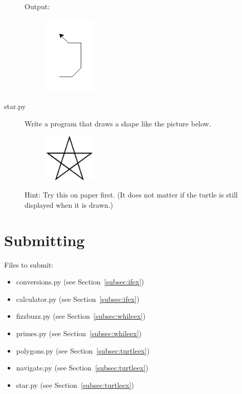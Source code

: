 \documentclass[11pt]{cselabheader}
\begin{document}
\begin{description}
    Output:
  \begin{figure}[!ht]
    \centering
    \includegraphics[width=1.0in]{img/navigate}
  \end{figure}

  \item[star.py] Write a program that draws a shape like the picture below.

    \begin{figure}[!ht]
      \centering
      \includegraphics[width=1.0in]{img/star}
    \end{figure}

    Hint: Try this on paper first. (It does not matter if the turtle is still
    displayed when it is drawn.)

\end{description}

\pagebreak

\section{Submitting}

Files to submit:
\begin{itemize}
  \item conversions.py (see Section~\ref{subsec:ifex})
  \item calculator.py (see Section~\ref{subsec:ifex})
  \item fizzbuzz.py (see Section~\ref{subsec:whileex})
  \item primes.py (see Section~\ref{subsec:whileex})
  \item polygons.py (see Section~\ref{subsec:turtleex})
  \item navigate.py (see Section~\ref{subsec:turtleex})
  \item star.py (see Section~\ref{subsec:turtleex})
\end{itemize}
\end{document}
